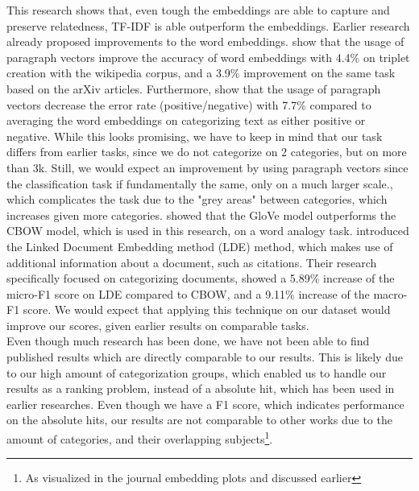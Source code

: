 \documentclass[../../Thesis.tex]{subfiles}
\begin{document}
This research shows that, even tough the embeddings are able to capture and preserve relatedness, TF-IDF is able outperform the embeddings. Earlier research already proposed improvements to the word embeddings. \citet{dai2015document} show that the usage of paragraph vectors improve the accuracy of word embeddings with 4.4\% on triplet creation with the wikipedia corpus, and a 3.9\% improvement on the same task based on the arXiv articles. Furthermore, \citet{le2014distributed} show that the usage of paragraph vectors decrease the error rate (positive/negative) with 7.7\% compared to averaging the word embeddings on categorizing text as either positive or negative. While this looks promising, we have to keep in mind that our task differs from earlier tasks, since we do not categorize on 2 categories, but on more than 3k. Still, we would expect an improvement by using paragraph vectors since the classification task if fundamentally the same, only on a much larger scale., which complicates the task due to the "grey areas"  between categories, which increases given more categories. \citet{pennington2014glove} showed that the GloVe model outperforms the CBOW model, which is used in this research, on a word analogy task. \citet{wang2016linked} introduced the Linked Document Embedding method (LDE) method, which makes use of additional information about a document, such as citations. Their research specifically focused on categorizing documents, showed a 5.89\% increase of the micro-F1 score on LDE compared to CBOW, and a 9.11\% increase of the macro-F1 score. We would expect that applying this technique on our dataset would improve our scores, given earlier results on comparable tasks.\\
Even though  much research has been done, we have not been able to find published results which are directly comparable to our results. This is likely due to our high amount of categorization groups, which enabled us to handle our results as a ranking problem, instead of a absolute hit, which has been used in earlier researches\cite{wang2016linked}. Even though we have a F1 score, which indicates performance on the absolute hits, our results are not comparable to other works due to the amount of categories, and their overlapping subjects\footnote{As visualized in the journal embedding plots and discussed earlier}.
\end{document}
